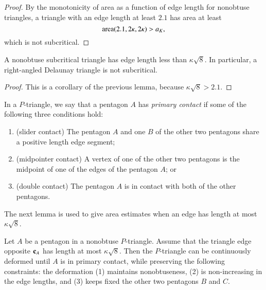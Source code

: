 \begin{proof} By the monotonicity of area as a function of edge length
  for nonobtuse triangles, a triangle with an edge length at least
  $2.1$ has area at least
\[
{\operatorname{area}}(2.1,2\kappa,2\kappa) > a_K,
\] %
which is not subcritical.
\end{proof}

\begin{lemma}\label{lemma:right} 
  A nonobtuse subcritical triangle has edge length less than
  $\kappa\sqrt8$.  In particular, a right-angled Delaunay triangle is
  not subcritical.
\end{lemma}

\begin{proof}  
This is a corollary of the previous lemma, because $\kappa\sqrt8 >
2.1$.
%
\end{proof}


\begin{definition}
In a $P$-triangle, we say that a pentagon $A$ has {\it primary
  contact} if some of the following three conditions hold:
\begin{enumerate}
\item (slider contact) The pentagon $A$ and one $B$ of the other two pentagons
share a positive length edge segment;
\item (midpointer contact)  A vertex of one of the other two pentagons
is  the midpoint of one of the edges of the pentagon $A$; or
\item (double contact) The pentagon $A$ is in contact
with both of the other pentagons.
\end{enumerate}
\end{definition}

The next lemma is used to give area
estimates when an edge has length at most $\kappa\sqrt{8}$.

\begin{lemma}\label{lemma:primary-contact} 
  Let $A$ be a pentagon in a nonobtuse $P$-triangle.  Assume that the
  triangle edge opposite ${\mathbf c}_A$ has length at most $\kappa\sqrt{8}$.
  Then the $P$-triangle can be continuously deformed until $A$ is in
  primary contact, while preserving the following constraints: the
  deformation (1) maintains nonobtuseness, (2) is non-increasing in
  the edge lengths, and (3) keeps fixed the other two pentagons $B$
  and $C$.
\end{lemma}

